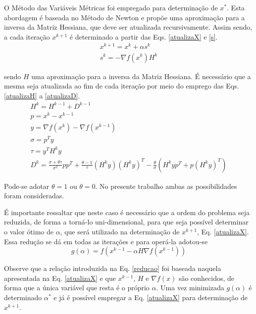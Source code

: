 \documentclass[12pt]{article}
\begin{document}
		O Método das Variáveis Métricas foi empregado para determinação de $ x^* $. Esta abordagem é baseada no Método de Newton e propõe uma aproximação para a inversa da Matriz Hessiana, que deve ser atualizada recursivamente. Assim sendo, a cada iteração $ x^{k+1} $ é determinado a partir das Eqs. \ref{atualizaX} e \ref{s}. 
		\begin{gather}
			x^{k+1} = x^k + \alpha s^k \label{atualizaX} \\
			s^k = - \nabla f(x^k)H^k \label{s}
		\end{gather}
		
		
		\noindent sendo $ H $ uma aproximação para a inversa da Matriz Hessiana. É necessário que a mesma seja atualizada ao fim de cada iteração por meio do emprego das Eqs. \ref{atualizaH} a \ref{atualizaD}.
		\begin{gather}
			H^k = H^{k-1} + D^{k-1} \label{atualizaH} \\
			p = x^k - x^{k-1} \\
			y = \nabla f(x^k) - \nabla f(x^{k-1}) \\
			\sigma = p^T y \\
			\tau = y^T H^k y \\
			D^k = \frac{\sigma + \theta \tau}{\sigma^2} pp^T + \frac{\theta - 1}{\tau} (H^k y)(H^k y)^T - \frac{\theta}{\sigma} (H^k y p^T + p(H^k y)^T) \label{atualizaD}
		\end{gather}
		
		Pode-se adotar $ \theta = 1 $ ou $ \theta = 0 $. No presente trabalho ambas as possibilidades foram consideradas. 
		
		É importante ressaltar que neste caso é necessário que a ordem do problema seja reduzida, de forma a torná-lo uni-dimensional, para que seja possível determinar o valor ótimo de $ \alpha $, que será utilizado na determinação de $ x^{k+1} $, Eq. \ref{atualizaX}. Essa redução se dá em todas as iterações e para operá-la adotou-se
		\begin{equation}
			g(\alpha) = f(x^{k-1} - \alpha H \nabla f(x^{k-1})) \label{reducao}
		\end{equation} 
		
		Observe que a relação introduzida na Eq. \ref{reducao} foi baseada naquela apresentada na Eq. \ref{atualizaX} e que $ x^{k-1} $, $ H $ e $ \nabla f(x) $ são conhecidos, de forma que a única variável que resta é o próprio $ \alpha $. Uma vez minimizada $ g(\alpha) $ é determinado $ \alpha^* $ e já é possível empregar a Eq. \ref{atualizaX} para determinação de $ x^{k+1} $. 
		
\end{document}

